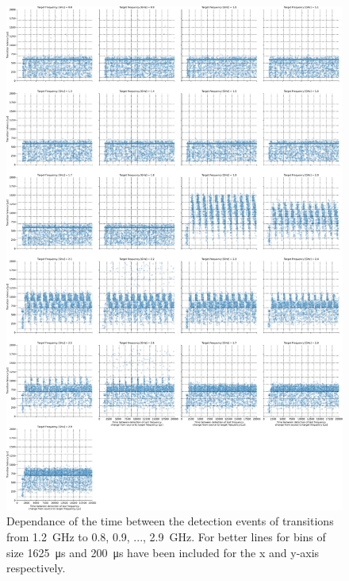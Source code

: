 \begin{figure}[]
    \centering
    \includegraphics[width=\columnwidth]{fig/ftalat_scatter_wait_transition_latency_hati_source_1.2.pdf}
    \caption{Dependance of the time between the detection events of transitions from \SI{1.2}{\GHz} to \SI{0.8}{}, \SI{0.9}{}, ..., \SI{2.9}{\GHz}. For better lines for bins of size \SI{1625}{\us} and \SI{200}{\us} have been included for the x and y-axis respectively.}
\end{figure}
